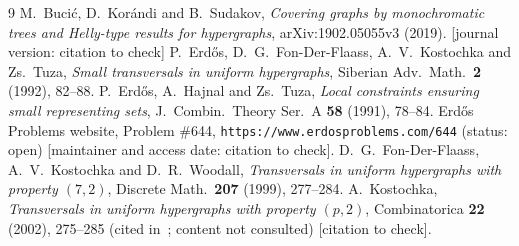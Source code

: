 \documentclass[11pt]{amsart}
\theoremstyle{definition}
\theoremstyle{remark}
\begin{document}
\begin{thebibliography}{9}
 M.~Buci\'c, D.~Kor\'andi and B.~Sudakov, \emph{Covering graphs by monochromatic trees and Helly-type results for hypergraphs}, arXiv:1902.05055v3 (2019). [journal version: citation to check]
 P.~Erd\H{o}s, D.~G.~Fon-Der-Flaass, A.~V.~Kostochka and Zs.~Tuza, \emph{Small transversals in uniform hypergraphs}, Siberian Adv.\ Math.\ \textbf{2} (1992), 82--88.
 P.~Erd\H{o}s, A.~Hajnal and Zs.~Tuza, \emph{Local constraints ensuring small representing sets}, J.\ Combin.\ Theory Ser.~A \textbf{58} (1991), 78--84.
 Erd\H{o}s Problems website, Problem \#644, \texttt{https://www.erdosproblems.com/644} (status: open) [maintainer and access date: citation to check].
 D.~G.~Fon-Der-Flaass, A.~V.~Kostochka and D.~R.~Woodall, \emph{Transversals in uniform hypergraphs with property $(7,2)$}, Discrete Math.\ \textbf{207} (1999), 277--284.
 A.~Kostochka, \emph{Transversals in uniform hypergraphs with property $(p,2)$}, Combinatorica \textbf{22} (2002), 275--285 (cited in~\cite{BKS}; content not consulted) [citation to check].
\end{thebibliography}
\end{document}
